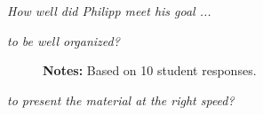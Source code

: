 \begin{boenumerate}
\item \textit{How well did Philipp meet his goal ...}
\begin{itemize}
\item \textit{to be well organized?}

\begin{figure}[h!]\centering
{}\hspace{0.75cm}
\begin{center}
\begin{minipage}[t]{0.85\columnwidth}\vspace{-0.75cm}
\item\scriptsize{\textbf{Notes:} Based on 10 student responses. }
\end{minipage}
\end{center}
\end{figure}


\item \textit{to present the material at the right speed?}


\end{itemize}
\end{boenumerate}
